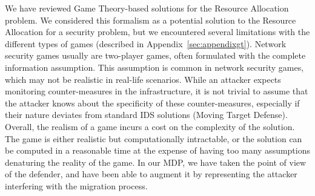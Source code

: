 We have reviewed Game Theory-based solutions for the Resource Allocation problem.
We considered this formalism as a potential solution to the Resource Allocation for a security problem, but we encountered several limitations with the different types of games (described in Appendix~\ref{sec:appendixgt}). Network security games usually are two-player games, often formulated with the complete information assumption. 
This assumption is common in network security games, which may not be realistic in real-life scenarios.
While an attacker expects monitoring counter-measures in the infrastructure, it is not trivial to assume that the attacker knows about the specificity of these counter-measures, especially if their nature deviates from standard IDS solutions (\eg Moving Target Defense).
Overall,  the realism of a game incurs a cost on the complexity of the solution.
The game is either realistic but computationally intractable, or the solution can be computed in a reasonable time at the expense of having too many assumptions denaturing the reality of the game.
In our MDP, we have taken the point of view of the defender, and have been able to augment it by representing the attacker interfering with the migration process. 




